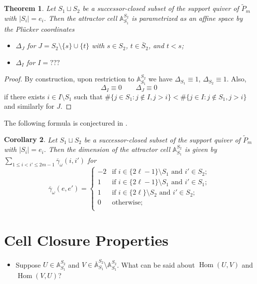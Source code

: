 \documentclass{amsart}
\newtheorem{theorem}{Theorem}
\newtheorem{corollary}[theorem]{Corollary}
\numberwithin{equation}{section}
\renewcommand{\AA}{\mathbb{A}}
\newcommand{\Hom}{\operatorname{Hom}}
\begin{document}
  \begin{theorem}
    Let $S_1\sqcup S_2$ be a successor-closed subset of the support quiver of $\tilde P_m$ with $|S_i|=e_i$.
    Then the attractor cell $\AA_{S_1}^{S_2}$ is parametrized as an affine space by the Pl\"ucker coordinates
    \begin{itemize}
      \item $\Delta_J$ for $J=S_2\setminus\{s\}\cup\{t\}$ with $s\in S_2$, $t\in\bar{S}_2$, and $t<s$;
      \item $\Delta_I$ for $I=???$
    \end{itemize}
  \end{theorem}
  \begin{proof}
    By construction, upon restriction to $\AA_{S_1}^{S_2}$ we have $\Delta_{S_1}\equiv 1$, $\Delta_{S_2}\equiv 1$.
    Also,
    \[\Delta_I\equiv 0 \qquad \Delta_J\equiv 0\]
    if there exists $i\in I\setminus S_1$ such that $\#\{j\in S_1:j\notin I, j>i\} < \#\{j\in I:j\notin S_1,j>i\}$ and similarly for $J$.
  \end{proof}

  The following formula is conjectured in \cite{rupel-weist}.
  \begin{corollary}
    Let $S_1\sqcup S_2$ be a successor-closed subset of the support quiver of $\tilde P_m$ with $|S_i|=e_i$.
    Then the dimension of the attractor cell $\AA_{S_1}^{S_2}$ is given by $\sum\limits_{1 \le i < i' \le 2m-1}\overline{\gamma}_\omega(i,i')$ for
    \begin{equation}
      \overline{\gamma}_\omega(e,e')=\begin{cases}
        -2 & \text{if $i\in \{2\ell-1\}\setminus S_1$ and $i'\in S_2$;}\\ 
        1 & \text{if $i\in \{2\ell-1\}\setminus S_1$ and $i'\in S_1$;}\\ 
        1 & \text{if $i\in \{2\ell\}\setminus S_2$ and $i'\in S_2$;}\\ 
        0 & \text{otherwise;}\\ 
      \end{cases}
    \end{equation} 
  \end{corollary}

\section{Cell Closure Properties}

  \begin{itemize}
    \item Suppose $U\in\AA_{S_1}^{S_2}$ and $V\in\overline{\AA}_{S_1}^{S_2}\setminus\AA_{S_1}^{S_2}$.
      What can be said about $\Hom(U,V)$ and $\Hom(V,U)$?
  \end{itemize}
\end{document}
